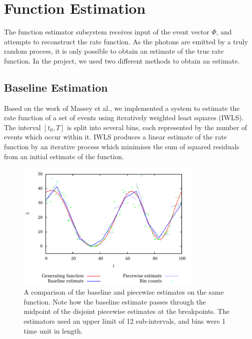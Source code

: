 \documentclass[a4paper,11pt]{article}
\begin{document}
\section{Function Estimation}
\label{sec-3}

  The function estimator subsystem receives input of the event vector $\Phi$, and
  attempts to reconstruct the rate function. As the photons are emitted by a
  truly random process, it is only possible to obtain an estimate of the true
  rate function. In the project, we used two different methods to obtain an
  estimate.
\subsection{Baseline Estimation}
\label{sec-3-1}

   Based on the work of Massey et al.\cite{massey}, we implemented a system to
   estimate the rate function of a set of events using iteratively weighted
   least squares (IWLS). The interval $[t_0,T]$ is split into several bins, each
   represented by the number of events which occur within it. IWLS produces a
   linear estimate of the rate function by an iterative process which minimises
   the sum of squared residuals from an initial estimate of the function.

    \begin{figure}[]
    \centering
    \includegraphics[width=0.8\textwidth]{images/pcbase}

    \caption{A comparison of the baseline and piecewise estimates on the same
    function. Note how the baseline estimate passes through the midpoint of the
    disjoint piecewise estimates at the breakpoints. The estimators used an
    upper limit of 12 sub-intervals, and bins were 1 time unit in length.}

    \label{fig:basecomp}
    \end{figure}
\end{document}
